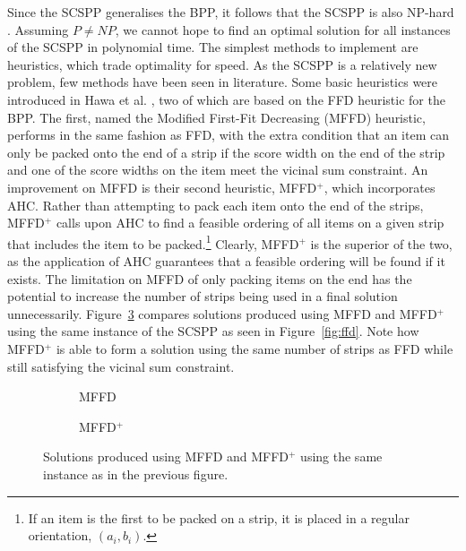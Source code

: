 \documentclass{elsarticle}
\begin{document}
\noindent Since the SCSPP generalises the BPP, it follows that the SCSPP is also NP-hard \cite{garey1979}. Assuming $P \neq NP$, we cannot hope to find an optimal solution for all instances of the SCSPP in polynomial time. The simplest methods to implement are heuristics, which trade optimality for speed. As the SCSPP is a relatively new problem, few methods have been seen in literature. Some basic heuristics were introduced in Hawa et al. \cite{hawa2018}, two of which are based on the FFD heuristic for the BPP. The first, named the Modified First-Fit Decreasing (MFFD) heuristic, performs in the same fashion as FFD, with the extra condition that an item can only be packed onto the end of a strip if the score width on the end of the strip and one of the score widths on the item meet the vicinal sum constraint. An improvement on MFFD is their second heuristic, MFFD$^+$, which incorporates AHC. Rather than attempting to pack each item onto the end of the strips, MFFD$^+$ calls upon AHC to find a feasible ordering of all items on a given strip that includes the item to be packed.\footnote{If an item is the first to be packed on a strip, it is placed in a regular orientation, $(a_i, b_i)$.} Clearly, MFFD$^+$ is the superior of the two, as the application of AHC guarantees that a feasible ordering will be found if it exists. The limitation on MFFD of only packing items on the end has the potential to increase the number of strips being used in a final solution unnecessarily. Figure~\ref{fig:mffdvsmffdplus} compares solutions produced using MFFD and MFFD$^+$ using the same instance of the SCSPP as seen in Figure~\ref{fig:ffd}. Note how MFFD$^+$ is able to form a solution using the same number of strips as FFD while still satisfying the vicinal sum constraint.

\begin{figure}[H]	
	\centering
	\begin{subfigure}[h]{0.45\textwidth}
		
		\caption{MFFD}
		\label{fig:mffd}
	\end{subfigure} \hspace{10mm}
	\begin{subfigure}[h]{0.45\textwidth}
		
		\caption{MFFD$^+$}
		\label{fig:mffdplus}
	\end{subfigure}
	\caption{Solutions produced using MFFD and MFFD$^+$ using the same instance as in the previous figure.}
	\label{fig:mffdvsmffdplus}
\end{figure}
\end{document}
